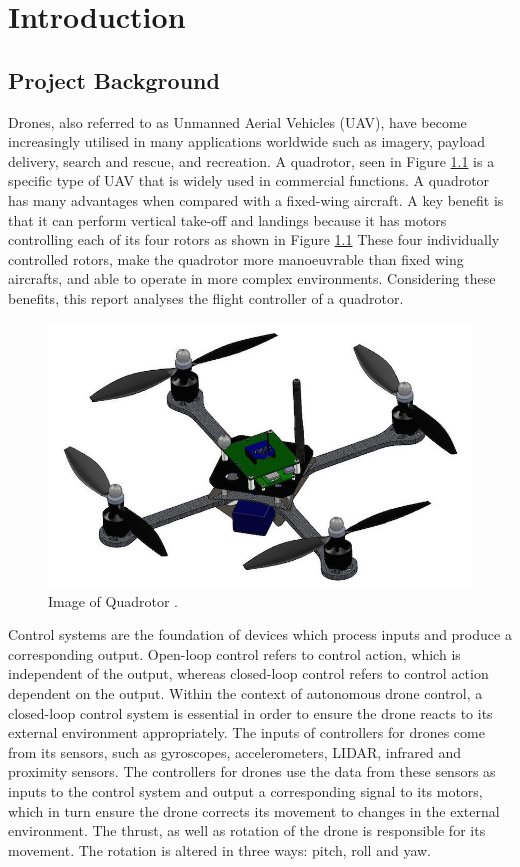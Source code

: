 \chapter{Introduction}
\section{Project Background}
Drones, also referred to as Unmanned Aerial Vehicles (UAV), have become increasingly utilised in many applications worldwide such as imagery, payload delivery, search and rescue, and recreation. A quadrotor, seen in Figure \ref{fig:quadrotor} is a specific type of UAV that is widely used in commercial functions. A quadrotor has many advantages when compared with a fixed-wing aircraft. A key benefit is that it can perform vertical take-off and landings because it has motors controlling each of its four rotors as shown in Figure \ref{fig:quadrotor} These four individually controlled rotors, make the quadrotor more manoeuvrable than fixed wing aircrafts, and able to operate in more complex environments. Considering these benefits, this report analyses the flight controller of a quadrotor. 
\begin{figure}[H]
    \centering
    \includegraphics[width = 0.6 \textwidth]{img/quadrotor.jpg}
    \caption[Image of Quadrotor.]{Image of Quadrotor \cite{zainquad}.}
    \label{fig:quadrotor}
\end{figure}
Control systems are the foundation of devices which process inputs and produce a corresponding output. Open-loop control refers to control action, which is independent of the output, whereas closed-loop control refers to control action dependent on the output. Within the context of autonomous drone control, a closed-loop control system is essential in order to ensure the drone reacts to its external environment appropriately. The inputs of controllers for drones come from its sensors, such as gyroscopes, accelerometers, LIDAR, infrared and proximity sensors. The controllers for drones use the data from these sensors as inputs to the control system and output a corresponding signal to its motors, which in turn ensure the drone corrects its movement to changes in the external environment. The thrust, as well as rotation of the drone is responsible for its movement. The rotation is altered in three ways: pitch, roll and yaw. 

